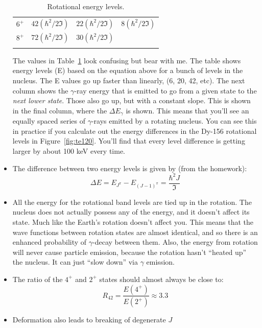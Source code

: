 \documentclass[letter]{article}
\begin{document}
\begin{itemize}
\begin{table}[hbt]
\begin{tabular}{llll}
$6^+$          & $42(\hbar^2/2\Im)$ & $22(\hbar^2/2\Im)$ & $8(\hbar^2/2\Im)$                     \\
$8^+$          & $72(\hbar^2/2\Im)$ & $30(\hbar^2/2\Im)$  &                      \\
               &                    &                    &                     
\end{tabular}
\caption{Rotational energy levels.}
\label{tab:rotation}
\end{table}
The values in Table~\ref{tab:rotation} look confusing but bear with
me. The table shows energy levels (E) based on the
equation above for a bunch of levels in the nucleus. The E values go up faster
than linearly, (6, 20, 42, etc). The next column shows the 
$\gamma$-ray energy that is emitted to go from a given state to the
\textit{next lower state}. Those also go up, but with a constant
slope. This is shown in the final column, where the $\Delta{}E_\gamma$
is shown. This means that you'll see an equally spaced series of
$\gamma$-rays emitted by a rotating nucleus. You can see this in
practice if you calculate out the energy differences in the Dy-156
rotational levels in Figure~\ref{fig:te120}. You'll find that every
level difference is getting larger by about 100 keV every time.
~\cite[Lec 13-16]{lecture}
\item The difference between two energy levels is given by (from the
  homework):
  \begin{equation*}
    \Delta{}E=E_{J^\pi}-E_{(J-1)^\pi}=\frac{\hbar^2J}{\Im}
  \end{equation*}
\item All the energy for the rotational band levels are tied up in the
  rotation. The nucleus does not actually possess any of the energy,
  and it doesn't affect its state. Much like the Earth's rotation
  doesn't affect you. This means that the wave functions between
  rotation states are almost identical, and so there is an enhanced
  probability of $\gamma$-decay between them. Also, the energy from
  rotation will never cause particle emission, because the rotation
  hasn't ``heated up'' the nucleus. It can just ``slow down'' via
  $\gamma$ emission.\cite[Lec. 13-16]{lecture}
\item The ratio of the $4^+$ and $2^+$ states should almost always be
  close to:
  \begin{equation*}
    R_{42}=\frac{E(4^+)}{E(2^+)} \approx 3.3
  \end{equation*}
\item  Deformation also leads to breaking of degenerate $J$

\end{itemize}
\end{document}
